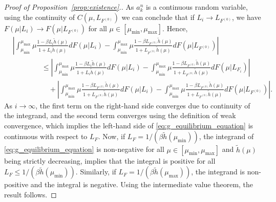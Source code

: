 \documentclass[a4paper,11pt,twoside]{article}
\numberwithin{equation}{section}
\numberwithin{figure}{section}
\theoremstyle{plain}
\newcommand{\1}{\mathbbm{1}}
\begin{document}
\begin{proof}[Proof of Proposition~\ref{prop:existence}.]
As $a_k^n$ is a continuous random variable, using the continuity of $C(\mu,L_{F^{(0)}})$ we can conclude that if $L_{i}\to L_{F^{(0)}}$, we have $F(\mu|L_{i})\to F(\mu|L_{F^{(0)}})$ for all $\mu\in[\mu_{\min}, \mu_{\max}]$. Hence, 
\begin{align*}
&\left|\int_{\mu_{\min}}^{\mu_{\max}}\mu\frac{1-\beta L_i\tilde{h}(\mu)}{1+L_i\tilde{h}(\mu)}dF(\mu|L_i)-\int_{\mu_{\min}}^{\mu_{\max}}\mu\frac{1-\beta L_{F^{(0)}}\tilde{h}(\mu)}{1+L_{F^{(0)}}\tilde{h}(\mu)}dF(\mu|L_{F^{(0)}})\right|\\
&\qquad\qquad\leq \left|\int_{\mu_{\min}}^{\mu_{\max}}\mu\frac{1-\beta L_i\tilde{h}(\mu)}{1+L_i\tilde{h}(\mu)}dF(\mu|L_i)-\int_{\mu_{\min}}^{\mu_{\max}}\mu\frac{1-\beta L_{F^{(0)}}\tilde{h}(\mu)}{1+L_{F^{(0)}}\tilde{h}(\mu)}dF(\mu|L_{F_i})\right|\\
&\qquad\qquad\quad + \left|\int_{\mu_{\min}}^{\mu_{\max}}\mu\frac{1-\beta L_{F^{(0)}}\tilde{h}(\mu)}{1+L_{F^{(0)}}\tilde{h}(\mu)}dF(\mu|L_i)-\int_{\mu_{\min}}^{\mu_{\max}}\mu\frac{1-\beta L_{F^{(0)}}\tilde{h}(\mu)}{1+L_{F^{(0)}}\tilde{h}(\mu)}dF(\mu|L_{F^{(0)}})\right|.
\end{align*}
As $i\to \infty$, the first term on the right-hand side converges due to continuity of the integrand, and the second term converges using the definition of weak convergence, which implies the left-hand side of \eqref{eq:g_equilibrium_equation} is continuous with respect to $L_F$. Now, if $L_F=1/(\beta \tilde{h}(\mu_{\min}))$, the integrand of \eqref{eq:g_equilibrium_equation} is non-negative for all $\mu\in[\mu_{\min}, \mu_{\max}]$ and $\tilde{h}(\mu)$ being strictly decreasing, implies that the integral is positive for all $L_F\leq 1/(\beta \tilde{h}(\mu_{\min}))$. Similarly, if $L_F=1/(\beta \tilde{h}(\mu_{\max}))$, the integrand is non-positive and the integral is negative. Using the intermediate value theorem, the result follows. \end{proof} 
\end{document}

